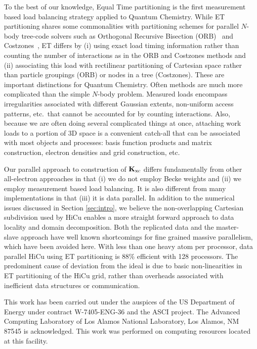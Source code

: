 \commentoutA{\documentclass[prl,aps,twocolumn,showpacs,twocolumngrid,superbib]{revtex4}}
\newcommand{\Kxc}{{\bf K}_{\mathrm{xc}}}
\begin{document}
To the best of our knowledge, Equal Time partitioning is the first
measurement based load balancing strategy applied to Quantum
Chemistry.  While ET partitioning shares some commonalities with
partitioning schemes for parallel $N$-body tree-code solvers such as
Orthogonal Recursive Bisection (ORB)~\cite{warren:92_article} and
Costzones~\cite{Singh93}, ET differs by (i) using exact load timing
information rather than counting the number of interactions as in the
ORB and Costzones methods and (ii) associating this load with
rectilinear partitioning of Cartesian space rather than particle
groupings (ORB) or nodes in a tree (Costzones).  These are important
distinctions for Quantum Chemistry.  Often methods are much more
complicated than the simple $N$-body problem.  Measured loads
encompass irregularities associated with different Gaussian extents,
non-uniform access patterns, etc.~that cannot be accounted for by
counting interactions.  Also, because we are often doing several
complicated things at once, attaching work loads to a portion of
3D space is a convenient catch-all that can be associated with most
objects and processes: basis function products and matrix construction,
electron densities and grid construction, etc.  

Our parallel approach to construction of $\Kxc$ differs fundamentally
from other all-electron approaches in that (i) we do not employ Becke
weights and (ii) we employ measurement based load balancing.  It is
also different from many implementations in that (iii) it is data
parallel.  In addition to the numerical issues discussed in Section
\ref{sec:intro}, we believe the non-overlapping Cartesian subdivision
used by HiCu enables a more straight forward approach to data locality
and domain decomposition.  Both the replicated data and the
master-slave approach have well known shortcomings for fine grained
massive parallelism, which have been avoided here.  With less than one
heavy atom per processor, data parallel HiCu using ET partitioning is
88\% efficient with 128 processors.  The predominent cause of
deviation from the ideal is due to basic non-linearities in ET
partitioning of the HiCu grid, rather than overheads associated with
inefficient data structures or communication.

\begin{acknowledgments}
This work has been carried out under the auspices of the US Department
of Energy under contract W-7405-ENG-36 and the ASCI project.  The
Advanced Computing Laboratory of Los Alamos National Laboratory, Los
Alamos, NM 87545 is acknowledged.  This work was performed on
computing resources located at this facility.
\end{acknowledgments}
\end{document}
